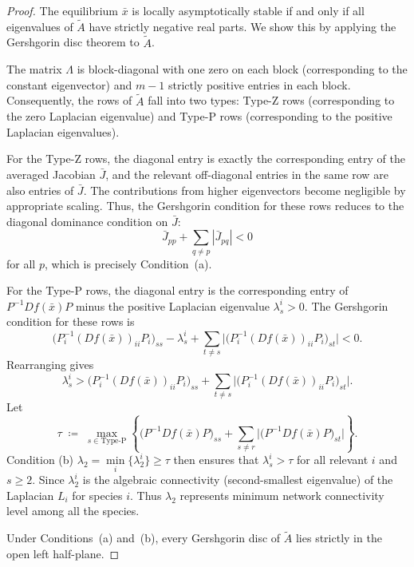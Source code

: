 \documentclass[12pt,a4paper]{article}
\theoremstyle{definition}
\begin{document}
\begin{proof}
The equilibrium \(\bar{x}\) is locally asymptotically stable if and only if all eigenvalues of \(\widetilde{A}\) have strictly negative real parts. We show this by applying the Gershgorin disc theorem to \(\widetilde{A}\).

The matrix \(\Lambda\) is block-diagonal with one zero on each block (corresponding to the constant eigenvector) and \(m-1\) strictly positive entries in each block. Consequently, the rows of \(\widetilde{A}\) fall into two types: Type-Z rows (corresponding to the zero Laplacian eigenvalue) and Type-P rows (corresponding to the positive Laplacian eigenvalues).

For the Type-Z rows, the diagonal entry is exactly the corresponding entry of the averaged Jacobian \(\bar{J}\), and the relevant off-diagonal entries in the same row are also entries of \(\bar{J}\). The contributions from higher eigenvectors become negligible by appropriate scaling. Thus, the Gershgorin condition for these rows reduces to the diagonal dominance condition on \(\bar{J}\):
\[
\bar{J}_{pp} + \sum_{q \neq p} |\bar{J}_{pq}| < 0
\]
for all \(p\), which is precisely Condition~(a).

For the Type-P rows, the diagonal entry is the corresponding entry of \(P^{-1}Df(\bar{x})P\) minus the positive Laplacian eigenvalue \(\lambda^i_s > 0\). The Gershgorin condition for these rows is
\[
\bigl(P^{-1}_{i}(Df(\bar{x}))_{ii}P_{i}\bigr)_{ss} - \lambda^i_s + \sum_{t \neq s} \bigl|\bigl(P^{-1}_{i}(Df(\bar{x}))_{ii}P_{i}\bigr)_{st}\bigr| < 0.
\]
Rearranging gives
\[
\lambda^i_s > \bigl(P^{-1}_{i}(Df(\bar{x}))_{ii}P_{i}\bigr)_{ss} + \sum_{t \neq s} \bigl|\bigl(P^{-1}_{i}(Df(\bar{x}))_{ii}P_{i}\bigr)_{st}\bigr|.
\]
Let
\begin{equation}
\tau
\;\coloneqq\;
\max_{s \in \text{Type-P}}
\left\{
\bigl(P^{-1}Df(\bar{x})P\bigr)_{ss}
+ \sum_{s \neq r}
\bigl|\bigl(P^{-1}Df(\bar{x})P\bigr)_{st}\bigr|
\right\}.
\label{eq:tau}
\end{equation}
Condition (b) \(\lambda_2 =\underset{i}{\min}\{\lambda^i_2\} \ge \tau\) then ensures that \(\lambda^i_s > \tau\) for all relevant \(i\) and \(s \geq 2\).  Since  \(\lambda_2^i\) is the algebraic connectivity (second-smallest eigenvalue) of the Laplacian \(L_i\) for species \(i\). Thus \(\lambda_2\) represents minimum network connectivity level among all the species. 

Under Conditions~(a) and~(b), every Gershgorin disc of \(\widetilde{A}\) lies strictly in the open left half-plane. 
\end{proof}
\end{document}
